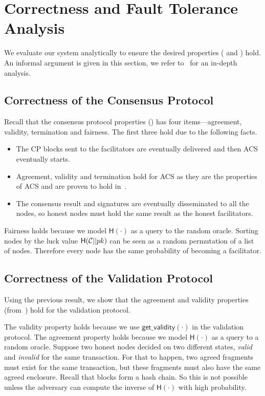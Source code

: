 \section{Correctness and Fault Tolerance Analysis}
\label{sec:analysis}
We evaluate our system analytically to ensure the desired properties ( and ) hold.
An informal argument is given in this section, we refer to~\cite[Chapter 4]{checo} for an in-depth analysis.

\subsection{Correctness of the Consensus Protocol}
Recall that the consensus protocol properties () has
four items---agreement, validity, termination and fairness.
The first three hold due to the following facts.
\begin{itemize}
    \item The CP blocks sent to the facilitators are eventually delivered and then ACS eventually starts.
    \item Agreement, validity and termination hold for ACS as they are the properties of ACS and are proven to hold in~\cite{miller2016honey}.
    \item The consensus result and signatures are eventually disseminated to all the nodes,
        so honest nodes must hold the same result as the honest facilitators.
\end{itemize}

Fairness holds because we model $\textsf{H}(\cdot)$ as a query to the random oracle.
Sorting nodes by the luck value $\textsf{H}(\mathcal{C} || pk)$ can be seen as a random permutation of a list of nodes.
Therefore every node has the same probability of becoming a facilitator.

\subsection{Correctness of the Validation Protocol}
\label{sec:correctness-of-validity}
Using the previous result,
we show that the agreement and validity properties (from~) hold for the validation protocol.

The validity property holds because we use $\textsf{get\_validity}(\cdot)$ in the validation protocol.
The agreement property holds because we model $\textsf{H}(\cdot)$ as a query to a random oracle.
Suppose two honest nodes decided on two different states, \emph{valid} and \emph{invalid} for the same transaction.
For that to happen, two agreed fragments must exist for the same transaction,
but these fragments must also have the same agreed enclosure.
Recall that blocks form a hash chain.
So this is not possible unless the adversary can compute the inverse of $\textsf{H}(\cdot)$ with high probability.

